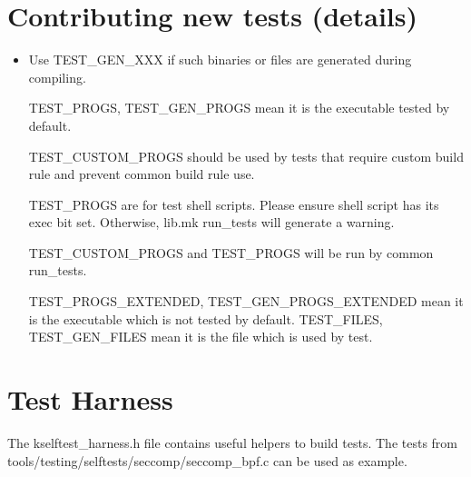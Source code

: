\documentclass[a4paper,8pt,english]{sphinxmanual}
\begin{document}
\section{Contributing new tests (details)}
\label{dev-tools/kselftest:contributing-new-tests-details}\begin{itemize}
\item {} 
Use TEST\_GEN\_XXX if such binaries or files are generated during
compiling.

TEST\_PROGS, TEST\_GEN\_PROGS mean it is the executable tested by
default.

TEST\_CUSTOM\_PROGS should be used by tests that require custom build
rule and prevent common build rule use.

TEST\_PROGS are for test shell scripts. Please ensure shell script has
its exec bit set. Otherwise, lib.mk run\_tests will generate a warning.

TEST\_CUSTOM\_PROGS and TEST\_PROGS will be run by common run\_tests.

TEST\_PROGS\_EXTENDED, TEST\_GEN\_PROGS\_EXTENDED mean it is the
executable which is not tested by default.
TEST\_FILES, TEST\_GEN\_FILES mean it is the file which is used by
test.

\end{itemize}


\section{Test Harness}
\label{dev-tools/kselftest:test-harness}
The kselftest\_harness.h file contains useful helpers to build tests.  The tests
from tools/testing/selftests/seccomp/seccomp\_bpf.c can be used as example.
\end{document}
